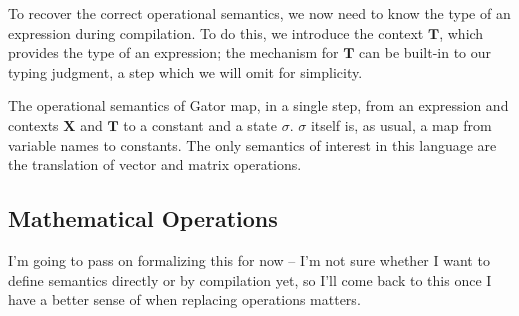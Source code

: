 \documentclass{article}
\newcommand{\Chi}{\mathbf{X}}
\newcommand{\Tau}{\mathbf{T}}
\begin{document}
To recover the correct operational semantics, we now need to know the type of an expression during compilation.
To do this, we introduce the context $\Tau$, which provides the type of an expression; the mechanism for $\Tau$ can be built-in to our typing judgment, a step which we will omit for simplicity.

The operational semantics of Gator map, in a single step, from an expression and contexts $\Chi$ and $\Tau$ to a constant and a state $\sigma$.  $\sigma$ itself is, as usual, a map from variable names to constants.
The only semantics of interest in this language are the translation of vector and matrix operations.
\subsection{Mathematical Operations}
I'm going to pass on formalizing this for now -- I'm not sure whether I want to define semantics directly or by compilation yet, so I'll come back to this once I have a better sense of when replacing operations matters.
\end{document}
